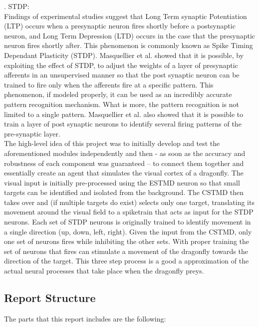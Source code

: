\documentclass[a4paper,11pt]{article}
\begin{document}
. STDP:\\
Findings of experimental studies suggest that Long Term synaptic Potentiation (LTP) occurs when a presynaptic neuron fires shortly before a postsynaptic neuron, and Long Term Depression (LTD) occurs in the case that the presynaptic neuron fires shortly after. This phenomenon is commonly known as Spike Timing Dependant Plasticity (STDP)\cite{stdp1}. Masquellier et al. showed that it is possible, by exploiting the effect of STDP, to adjust the weights of a layer of presynaptic afferents in an unsupervised manner so that the post synaptic neuron can be trained to fire only when the afferents fire at a specific pattern. This phenomenon, if modeled properly, it can be used as an incredibly accurate pattern recognition mechanism. What is more, the pattern recognition is not limited to a single pattern. Masquellier et al. also showed that it is possible to train a layer of post synaptic neurons to identify several firing patterns of the pre-synaptic layer\cite{stdp2}.\\ 



The high-level idea of this project was to initially develop and test the aforementioned modules independently and then - as soon as the accuracy and robustness of each component was guaranteed – to connect them together and essentially create an agent that simulates the visual cortex of a dragonfly. The visual input is initially pre-processed using the ESTMD neuron so that small targets can be identified and isolated from the background. The CSTMD then takes over and (if multiple targets do exist) selects only one target, translating its movement around the visual field to a spiketrain that acts as input for the STDP neurons. Each set of STDP neurons is originally trained to identify movement in a single direction (up, down, left, right). Given the input from the CSTMD, only one set of neurons fires while inhibiting the other sets. With proper training the set of neurons that fires can stimulate a movement of the dragonfly towards the direction of the target. This three step process is a good a approximation of the actual neural processes that take place when the dragonfly preys.


\subsection{Report Structure}

The parts that this report includes are the following:
\end{document}
